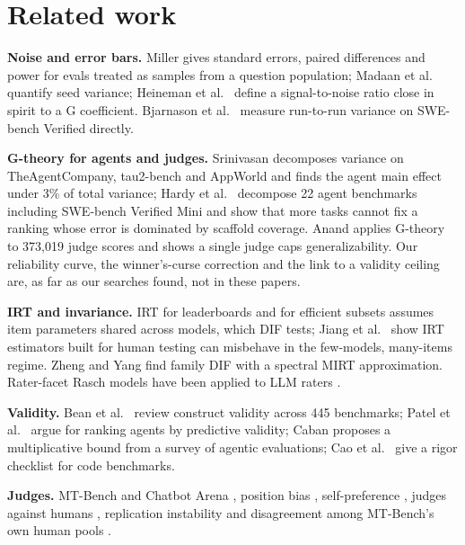 \documentclass[11pt]{article}
\begin{document}
\section{Related work}

\textbf{Noise and error bars.} Miller \citep{miller2024errorbars} gives standard errors, paired differences and power for evals treated as samples from a question population; Madaan et al.\ \citep{madaan2024variance} quantify seed variance; Heineman et al.\ \citep{heineman2025signal} define a signal-to-noise ratio close in spirit to a G coefficient. Bjarnason et al.\ \citep{bjarnason2026randomness} measure run-to-run variance on SWE-bench Verified directly.

\textbf{G-theory for agents and judges.} Srinivasan \citep{srinivasan2026ddr} decomposes variance on TheAgentCompany, tau2-bench and AppWorld and finds the agent main effect under 3\% of total variance; Hardy et al.\ \citep{hardy2026agentreliability} decompose 22 agent benchmarks including SWE-bench Verified Mini and show that more tasks cannot fix a ranking whose error is dominated by scaffold coverage. Anand \citep{anand2026askwhich} applies G-theory to 373,019 judge scores and shows a single judge caps generalizability. Our reliability curve, the winner's-curse correction and the link to a validity ceiling are, as far as our searches found, not in these papers.

\textbf{IRT and invariance.} IRT for leaderboards \citep{lalor2016irt,rodriguez2021evaluation,vania2021comparing} and for efficient subsets \citep{polo2024tinybenchmarks,hofmann2025fluid} assumes item parameters shared across models, which DIF tests; Jiang et al.\ \citep{jiang2026trustirt} show IRT estimators built for human testing can misbehave in the few-models, many-items regime. Zheng and Yang \citep{zheng2026familydif} find family DIF with a spectral MIRT approximation. Rater-facet Rasch models have been applied to LLM raters \citep{sachdeva2026rasch}.

\textbf{Validity.} Bean et al.\ \citep{bean2025measuring} review construct validity across 445 benchmarks; Patel et al.\ \citep{patel2026beyond} argue for ranking agents by predictive validity; Caban \citep{caban2026measurement} proposes a multiplicative bound from a survey of agentic evaluations; Cao et al.\ \citep{cao2025codebench} give a rigor checklist for code benchmarks.

\textbf{Judges.} MT-Bench and Chatbot Arena \citep{zheng2023judging,chiang2024arena}, position bias \citep{wang2023notfair}, self-preference \citep{panickssery2024selfpref,wataoka2024selfpref}, judges against humans \citep{thakur2025judging,bavaresco2024judgebench}, replication instability \citep{kumar2026verdicts} and disagreement among MT-Bench's own human pools \citep{jha2026whosegold}.
\end{document}
